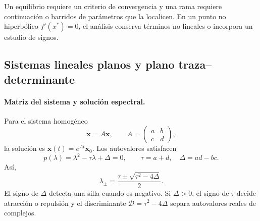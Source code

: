 \begin{warningbox}
Un equilibrio requiere un criterio de convergencia y una rama requiere continuación o
barridos de parámetros que la localicen. En un
punto no hiperbólico \(f'(x^*)=0\), el análisis conserva términos no lineales o
incorpora un estudio de signos.
\end{warningbox}


\subsection{Sistemas lineales planos y plano traza--determinante}

\paragraph{Matriz del sistema y solución espectral.}
Para el sistema homogéneo
\[
 \dot{\mathbf x}=A\mathbf x,\qquad
 A=\begin{pmatrix}a&b\\c&d\end{pmatrix},
\]
la solución es \(\mathbf x(t)=e^{At}\mathbf x_0\). Los autovalores satisfacen
\[
 p(\lambda)=\lambda^2-\tau\lambda+\Delta=0,\qquad
 \tau=a+d,\quad \Delta=ad-bc.
\]
Así,
\[
 \lambda_{\pm}=\frac{\tau\pm\sqrt{\tau^2-4\Delta}}{2}.
\]
El signo de \(\Delta\) detecta una silla cuando es negativo. Si \(\Delta>0\), el
signo de \(\tau\) decide atracción o repulsión y el discriminante
\(\mathcal D=\tau^2-4\Delta\) separa autovalores reales de complejos.

